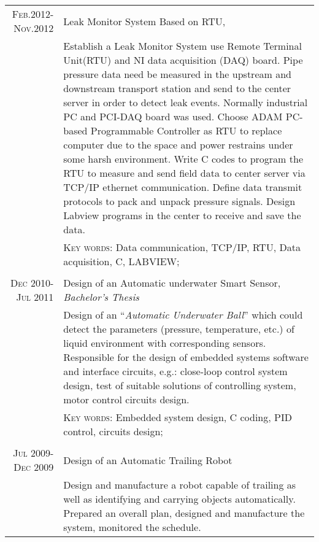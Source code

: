 \documentclass[a4paper,10pt]{article} %
\begin{document}
\begin{tabular}{r|p{11cm}}
\textsc{Feb.2012-Nov.2012} & Leak Monitor System Based on RTU, \emph{}\\
& \footnotesize{Establish a Leak Monitor System use Remote Terminal Unit(RTU) and NI data acquisition (DAQ) board. Pipe pressure data need be measured in the upstream and downstream transport station and send to the center server in order to detect leak events. Normally industrial PC and PCI-DAQ board was used. Choose ADAM PC-based Programmable Controller as RTU to replace computer due to the space and power restrains under some harsh environment.
Write C codes to program the RTU to measure and send field data to center server via TCP/IP ethernet communication. Define data transmit protocols to pack and unpack pressure signals. Design Labview programs in the center to receive and save the data.}\\
& \footnotesize{\textsc{Key words:} Data communication, TCP/IP, RTU, Data acquisition, C, LABVIEW;}\\
\multicolumn{2}{c}{} \\


\textsc{Dec 2010-Jul 2011} & Design of an Automatic underwater Smart Sensor, \emph{Bachelor's Thesis}\\
& \footnotesize{Design of an ``\emph{Automatic Underwater Ball}'' which could detect the parameters (pressure, temperature, etc.) of liquid environment with corresponding sensors. Responsible for the design of embedded systems software and interface circuits, e.g.: close-loop control system design, test of suitable solutions of controlling system, motor control circuits design.}\\
& \footnotesize{\textsc{Key words:} Embedded system design, C coding, PID control, circuits design;}\\
\multicolumn{2}{c}{} \\


\textsc{Jul 2009-Dec 2009} & Design of an Automatic Trailing Robot \emph{}\\
& \footnotesize{Design and manufacture a robot capable of trailing as well as identifying and carrying objects automatically. Prepared an overall plan, designed and manufacture the system, monitored the schedule.}
\end{tabular}


\end{document}

